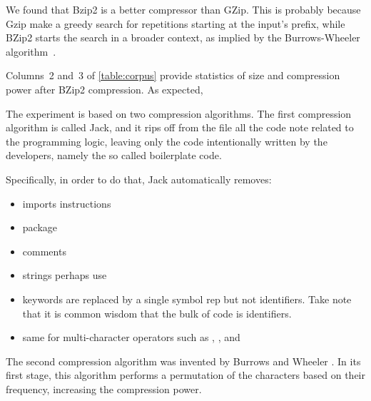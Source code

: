 We found that Bzip2 is a better compressor than GZip. This is probably because
Gzip make a greedy search for repetitions starting at the input's prefix, while
BZip2 starts the search in a broader context, as implied by the
Burrows-Wheeler algorithm~\cite{Burrows:Wheeler:94}. 

Columns~2 and~3 of \cref{table:corpus} provide statistics of size and
compression power after BZip2 compression. As expected, 



The experiment is based on two compression algorithms.
The first compression algorithm is called Jack, and it rips off from the file all the code note related to the programming logic, leaving
only the code intentionally written by the developers, namely the so called boilerplate code.

Specifically, in order to do that, Jack automatically removes:

\begin{itemize}
  \item imports instructions
  \item package
  \item comments
  \item strings perhaps use
  \item keywords are replaced by a single symbol rep
        but not identifiers. Take note that it is common wisdom that the bulk of code is identifiers.
  \item same for multi-character operators such as \cc{->}, \cc{[]}, and \cc{<<<<=}
\end{itemize}

The second compression algorithm was invented by Burrows and Wheeler
\cite{Burrows:Wheeler:94}. In its first stage, this algorithm performs a
permutation of the characters based on their frequency, increasing the
compression power.


